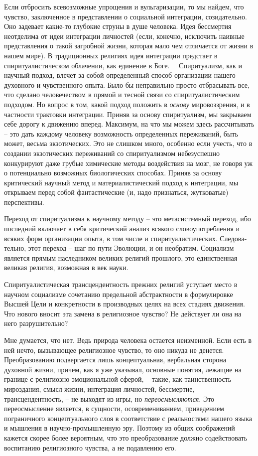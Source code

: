 \documentclass{book}
\begin{document}
Если отбросить всевозможные упрощения и вульгаризации, то мы найдем, что чувство, заключенное в представлении о со­циальной интеграции, созидательно. Оно задевает какие-то глу­бокие струны в душе человека. Идея бессмертия неотделима от идеи интеграции личностей (если, конечно, исключить наив­ные представления о такой загробной жизни, которая мало чем отличается от жизни в нашем мире). В традиционных религиях идея интеграции предстает в спиритуалистическом облачении, как единение в Боге.   Спиритуализм, как и научный подход, влечет за собой определенный способ организации нашего духов­ного и чувственного опыта. Было бы неправильно просто отбра­сывать все, что сделано человечеством в прямой и тесной связи со спиритуалистическим подходом. Но вопрос в том, какой подход положить в \textit{основу}  мировоззрения, и в частности трактовки интеграции. Приняв за основу спиритуализм, мы закры­ваем себе дорогу к движению вперед. Максимум, на что мы можем здесь рассчитывать -- это дать каждому человеку воз­можность определенных 
переживаний, быть может, весьма экзо­тических. Это не слишком много, особенно если учесть, что в создании экзотических переживаний со спиритуализмом небе­зуспешно конкурируют даже грубые химические методы воз­действия на мозг, не говоря уж о потенциально возможных биологических способах. Приняв за основу критический науч­ный метод и материалистический подход к интеграции, мы открываем перед собой фантастические (и, надо признаться, жутковатые) перспективы.

Переход от спиритуализма к научному методу -- это метасистемный переход, ибо последний включает в себя критиче­ский анализ всякого словоупотребления и всяких форм орга­низации опыта, в том числе и спиритуалистических. Следова­тельно, этот переход -- шаг по пути Эволюции, и он необратим. Социализм является прямым наследником великих религий прошлого, это единственная великая религия, возможная в век науки.

Спиритуалистическая трансцендентность прежних религий ус­тупает место в научном социализме сочетанию предельной аб­страктности в формулировке Высшей Цели и конкретности в производных целях на всех стадиях движения. Что нового вносит эта замена в религиозное чувство? Не действует ли она на него разрушительно?

Мне думается, что нет. Ведь природа человека остается неиз­менной. Если есть в ней нечто, вызывающее религиозное чувст­во, то оно никуда не денется. Преобразованию подвергается лишь концептуальная, вербальная сторона духовной жизни, причем, как я уже указывал, основные понятия, лежащие на границе с религиозно-эмоциональной сферой, -- такие, как таинст­венность мироздания, смысл жизни, интеграция личностей, бес­смертие, трансцендентность, -- не выходят из игры, но \textit{перео­смысляются}.  Это переосмысление является, в сущности, осовремениванием, приведением пограничного концептуального слоя в соответствие с реальностями нашего языка и мышления в научно-промышленную эру. Поэтому из общих соображений кажется скорее более вероятным, что это преобразование должно содействовать воспитанию религиозного чувства, а не подавлению его.
\end{document}
